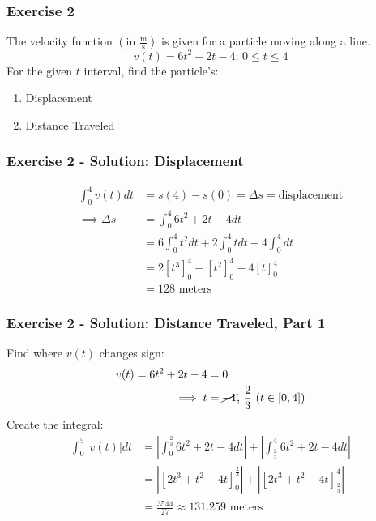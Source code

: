 \documentclass[12pt]{beamer}
\begin{document}
\begin{frame}
	\frametitle{Exercise 2}

	\large
	The velocity function $\left(\text{in }\frac{\text{m}}{\text{s}}\right)$ is given for a particle moving along a line. \\
	\[v(t)=6t^2+2t-4\text{; }0\leq t\leq 4\]
	\vfill
	For the given $t$ interval, find the particle's:
	\begin{enumerate}
		\item Displacement
		\item Distance Traveled
	\end{enumerate}
\end{frame}
\begin{frame}
	\frametitle{Exercise 2 - Solution: Displacement}

	\large
	\begin{align*}
		\int_{0}^{4}v(t)dt &= s(4)-s(0)=\Delta s=\text{displacement}\\
		\implies \Delta s &= \int_{0}^{4}6t^2+2t-4dt\\
		&= 6\int_{0}^{4}t^2dt+2\int_{0}^{4}tdt-4\int_{0}^{4}dt\\
		&= 2[t^3]_0^4+[t^2]_0^4-4[t]_0^4\\
		&= \boxed{128\text{ meters}}
	\end{align*}
\end{frame}
\begin{frame}
	\frametitle{Exercise 2 - Solution: Distance Traveled, Part 1}

	Find where $v(t)$ changes sign:
	\begin{align*}
		v(t)=6t^2+2t-4&=0\\
		\implies t&=\cancel{-1}\text{, }\frac{2}{3}\text{ ($t\in [0,4]$)}
	\end{align*}
	Create the integral:
	\begin{align*}
		\int_{0}^{5}|v(t)|dt&=\left|\int_{0}^{\frac{2}{3}}6t^2+2t-4dt\right|+\left|\int_{\frac{2}{3}}^{4}6t^2+2t-4dt\right|\\
		&= \left|[2t^3+t^2-4t]_0^\frac{2}{3}\right|+\left|[2t^3+t^2-4t]_\frac{2}{3}^4\right|\\
		&= \boxed{\frac{3544}{27}\approx131.259\text{ meters}}
	\end{align*}
\end{frame}
\end{document}
